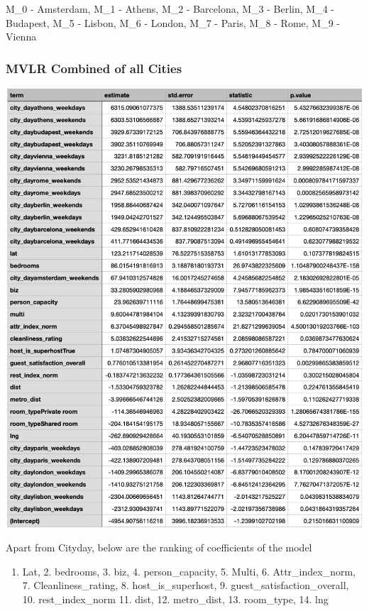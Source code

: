 \documentclass[
]{article}
\providecommand{\tightlist}{%
  \setlength{\itemsep}{0pt}\setlength{\parskip}{0pt}}
\begin{document}
M\_0 - Amsterdam, M\_1 - Athens, M\_2 - Barcelona, M\_3 - Berlin, M\_4 -
Budapest, M\_5 - Lisbon, M\_6 - London, M\_7 - Paris, M\_8 - Rome, M\_9
- Vienna

\hypertarget{mvlr-combined-of-all-cities}{%
\subsubsection{MVLR Combined of all
Cities}\label{mvlr-combined-of-all-cities}}

\includegraphics{b.png}

Apart from Cityday, below are the ranking of coefficients of the model

\begin{enumerate}
\def\labelenumi{\arabic{enumi}.}
\tightlist
\item
  Lat, 2. bedrooms, 3. biz, 4. person\_capacity, 5. Multi, 6.
  Attr\_index\_norm, 7. Cleanliness\_rating, 8. host\_is\_superhost, 9.
  guest\_satisfaction\_overall, 10. rest\_index\_norm 11. dist, 12.
  metro\_dist, 13. room\_type, 14. lng
\end{enumerate}
\end{document}
